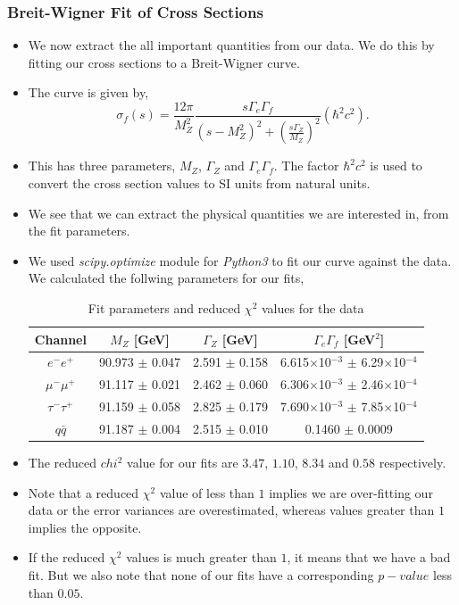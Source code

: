 \documentclass[10pt]{beamer}
\begin{document}
\begin{frame}
\frametitle{Breit-Wigner Fit of Cross Sections}
\begin{itemize}
  \item We now extract the all important quantities from our data. We do this by fitting our cross sections to a Breit-Wigner curve.
  \item The curve is given by,
  \begin{equation}
    \sigma_f (s) = \frac{12\pi}{M_Z^2} \frac{s \Gamma_e \Gamma_f}{(s-M_Z^2)^2 + \left(\frac{s\Gamma_Z}{M_Z}\right)^2} (\hbar^2 c^2).
  \end{equation}
  \item This has three parameters, $M_Z$, $\Gamma_Z$ and $\Gamma_e\Gamma_f$. The factor $\hbar^2 c^2$ is used to convert the cross section values to SI units from natural units.
  \item We see that we can extract the physical quantities we are interested in, from the fit parameters.
  \item We used \textit{scipy.optimize} module for \textit{Python3} to fit our curve against the data. We calculated the follwing parameters for our fits,
  \begin{table}
    \centering
    \begin{tabular}{c|ccc}
    \hline
    Channel        & $M_Z$ {[}GeV{]}    & $\Gamma_Z$ {[}GeV{]} & $\Gamma_e\Gamma_f$ {[}GeV$^2${]}                    \\ \hline
    $e^-e^+$       & 90.973 $\pm$ 0.047 & 2.591 $\pm$ 0.158    & 6.615$\times$10$^{-3}$ $\pm$ 6.29$\times$10$^{-4}$ \\
    $\mu^-\mu^+$   & 91.117 $\pm$ 0.021 & 2.462 $\pm$ 0.060    & 6.306$\times$10$^{-3}$ $\pm$ 2.46$\times$10$^{-4}$ \\
    $\tau^-\tau^+$ & 91.159 $\pm$ 0.058 & 2.825 $\pm$ 0.179    & 7.690$\times$10$^{-3}$ $\pm$ 7.85$\times$10$^{-4}$ \\
    $q\bar{q}$     & 91.187 $\pm$ 0.004 & 2.515 $\pm$ 0.010    & 0.1460 $\pm$ 0.0009                                \\ \hline
    \end{tabular}
    \caption{Fit parameters and reduced $\chi^2$ values for the data}
    \label{table:bwfit}
  \end{table}
\end{itemize}
\end{frame}

\begin{frame}
\begin{itemize}
  \item The reduced $chi^2$ value for our fits are $3.47$, $1.10$, $8.34$ and $0.58$ respectively.
  \item Note that a reduced $\chi^2$ value of less than $1$ implies we are over-fitting our data or the error variances are overestimated, whereas values greater than $1$ implies the opposite.
  \item If the reduced $\chi^2$ values is much greater than $1$, it means that we have a bad fit. But we also note that none of our fits have a corresponding $p-value$ less than $0.05$.
\end{itemize}
\end{frame}
\end{document}
